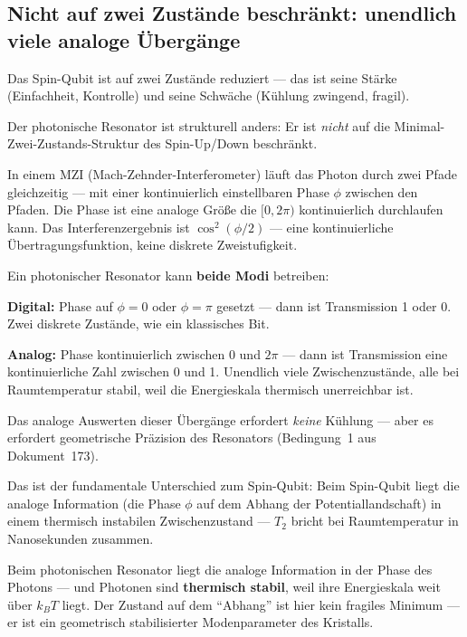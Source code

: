 \subsection{Nicht auf zwei Zustände beschränkt:
  unendlich viele analoge Übergänge}

Das Spin-Qubit ist auf zwei Zustände reduziert ---
das ist seine Stärke (Einfachheit, Kontrolle)
und seine Schwäche (Kühlung zwingend, fragil).

Der photonische Resonator ist strukturell anders:
Er ist \emph{nicht} auf die Minimal-Zwei-Zustands-Struktur
des Spin-Up/Down beschränkt.

In einem MZI (Mach-Zehnder-Interferometer)
läuft das Photon durch zwei Pfade gleichzeitig ---
mit einer kontinuierlich einstellbaren Phase $\phi$
zwischen den Pfaden.
Die Phase ist eine analoge Größe die
$[0, 2\pi)$ kontinuierlich durchlaufen kann.
Das Interferenzergebnis ist $\cos^2(\phi/2)$ ---
eine kontinuierliche Übertragungsfunktion,
keine diskrete Zweistufigkeit.

\begin{keypoint}
Ein photonischer Resonator kann \textbf{beide Modi} betreiben:

\textbf{Digital:} Phase auf $\phi = 0$ oder $\phi = \pi$ gesetzt ---
dann ist Transmission 1 oder 0.
Zwei diskrete Zustände, wie ein klassisches Bit.

\textbf{Analog:} Phase kontinuierlich zwischen 0 und $2\pi$ ---
dann ist Transmission eine kontinuierliche Zahl
zwischen 0 und 1. Unendlich viele Zwischenzustände,
alle bei Raumtemperatur stabil, weil die Energieskala
thermisch unerreichbar ist.

Das analoge Auswerten dieser Übergänge erfordert
\emph{keine} Kühlung --- aber es erfordert
geometrische Präzision des Resonators
(Bedingung~1 aus Dokument~173).
\end{keypoint}

Das ist der fundamentale Unterschied zum Spin-Qubit:
Beim Spin-Qubit liegt die analoge Information
(die Phase $\phi$ auf dem Abhang der Potentiallandschaft)
in einem thermisch instabilen Zwischenzustand ---
$T_2$ bricht bei Raumtemperatur in Nanosekunden zusammen.

Beim photonischen Resonator liegt die analoge Information
in der Phase des Photons --- und Photonen sind
\textbf{thermisch stabil}, weil ihre Energieskala
weit über $k_BT$ liegt.
Der Zustand auf dem ``Abhang'' ist hier kein
fragiles Minimum --- er ist ein geometrisch
stabilisierter Modenparameter des Kristalls.

